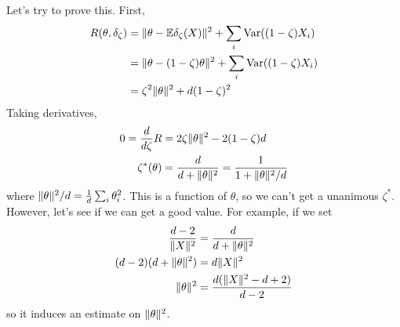 Let's try to prove this. First,
\begin{align*}
    R(\theta, \delta_{\zeta}) &= \lVert {\theta - \mathbb{E}\delta_{\zeta}(X)} \rVert^2 + \sum_{i} \text{Var}((1 - \zeta)X_i)\\
    &= \lVert {\theta - (1 - \zeta)\theta} \rVert^2 + \sum_{i} \text{Var}((1 - \zeta)X_i)\\
    &= \zeta^2\lVert {\theta} \rVert^2 + d(1 - \zeta)^2
\end{align*}
Taking derivatives,
\begin{align*}
    0 = \frac{d}{d\zeta}R &= 2\zeta\lVert {\theta} \rVert^2 - 2(1 - \zeta)d\\
    \zeta^{*}(\theta) &= \frac{d}{d + \lVert {\theta} \rVert^2} = \frac{1}{1 + \lVert {\theta} \rVert^2/d}
\end{align*}
where $\lVert {\theta} \rVert^2/d = \frac{1}{d}\sum_{i} \theta_i^2$. This is a function of $\theta$, so we can't get a unanimous $\zeta^{*}$. However, let's see if we can get a good value. For example, if we set
\begin{align*}
    \frac{d - 2}{\lVert {X} \rVert^2} &= \frac{d}{d + \lVert {\theta} \rVert^2}\\
    (d - 2)(d + \lVert {\theta} \rVert^2) &= d\lVert {X} \rVert^2\\
    \lVert {\theta} \rVert^2 &= \frac{d(\lVert {X} \rVert^2 - d + 2)}{d - 2}
\end{align*}
so it induces an estimate on $\lVert {\theta} \rVert^2$.

